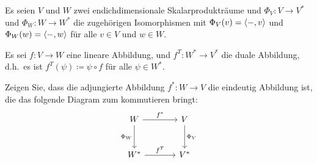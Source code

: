 \documentclass[a4paper, 10pt]{scrartcl}
\begin{document}


\begin{question}
  Es seien $V$ und $W$ zwei endichdimensionale Skalarprodukträume und $\Phi_V \colon V \to V^*$ und $\Phi_W \colon W \to W^*$ die zugehörigen Isomorphismen mit $\Phi_V(v) = \left\langle -,v \right\rangle$ und $\Phi_W(w) = \left\langle -,w \right\rangle$ für alle $v \in V$ und $w \in W$.
  
  Es sei $f \colon V \to W$ eine lineare Abbildung, und $f^T \colon W^* \to V^*$ die duale Abbildung, d.h.\ es ist $f^T(\psi) \coloneqq \psi \circ f$ für alle $\psi \in W^*$.
  
  Zeigen Sie, dass die adjungierte Abbildung $f^* \colon W \to V$ die eindeutig Abbildung ist, die das folgende Diagram zum kommutieren bringt:
  \[
    \begin{tikzcd}[row sep = large, column sep = large, ampersand replacement=\&]
          W
          \arrow{r}{f^*}
          \arrow{d}[left]{\Phi_W}
      \&  V
          \arrow{d}{\Phi_V}
      \\
          W^*
          \arrow{r}{f^T}
      \&  V^*
    \end{tikzcd}
  \]
\end{question}


\newpage


\printsolutions
\end{document}
